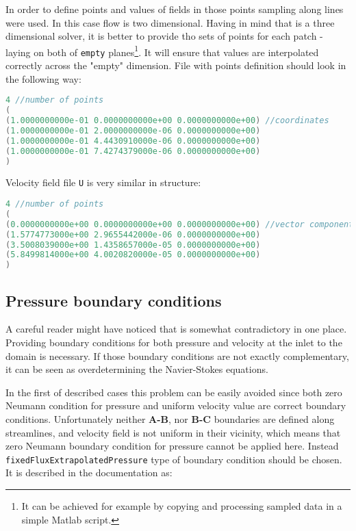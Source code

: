             In order to define points and values of fields in those points sampling along lines were used.
            In this case flow is two dimensional. Having in mind that \oFoam is a three dimensional solver, it is better to provide tho sets of points for each patch - laying on both of \texttt{empty} planes\footnote{It can be achieved for example by copying and processing sampled data in a simple Matlab script.}. It will ensure that values are interpolated correctly across the "empty" dimension. File with points definition should look in the following way:
            \begin{lstlisting}[language=C++]
4 //number of points
(
(1.0000000000e-01 0.0000000000e+00 0.0000000000e+00) //coordinates
(1.0000000000e-01 2.0000000000e-06 0.0000000000e+00)
(1.0000000000e-01 4.4430910000e-06 0.0000000000e+00)
(1.0000000000e-01 7.4274379000e-06 0.0000000000e+00)
)
            \end{lstlisting}
            Velocity field file \texttt{U} is very similar in structure:
            \begin{lstlisting}[language=C++]
4 //number of points
(
(0.0000000000e+00 0.0000000000e+00 0.0000000000e+00) //vector components
(1.5774773000e+00 2.9655442000e-06 0.0000000000e+00)
(3.5008039000e+00 1.4358657000e-05 0.0000000000e+00)
(5.8499814000e+00 4.0020820000e-05 0.0000000000e+00)
)
            \end{lstlisting}

        \subsection{Pressure boundary conditions}
            A careful reader might have noticed that \oFoam is somewhat contradictory in one place. Providing boundary conditions for both pressure and velocity at the inlet to the domain is necessary.
            If those boundary conditions are not exactly complementary, it can be seen as overdetermining the Navier-Stokes equations.

            In the first of described cases this problem can be easily avoided since both zero Neumann condition for pressure and uniform velocity value are correct boundary conditions. Unfortunately neither \textbf{A-B}, nor \textbf{B-C} boundaries are defined along streamlines, and velocity field is not uniform in their vicinity, which means that zero Neumann boundary condition for pressure cannot be applied here.
            Instead \texttt{fixedFluxExtrapolatedPressure} type of boundary condition should be chosen. It is described in the \oFoam documentation as:
